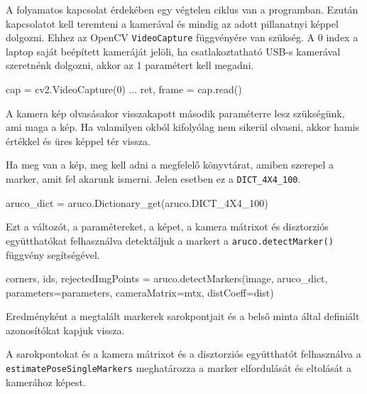 A folyamatos kapcsolat érdekében egy végtelen ciklus van a programban.
Ezután kapcsolatot kell teremteni a kamerával és mindig az adott pillanatnyi képpel dolgozni.
Ehhez az OpenCV \texttt{VideoCapture} függvényére van szükség. A 0 index a laptop saját beépített kameráját jelöli, ha csatlakoztatható USB-s kamerával szeretnénk dolgozni, akkor az 1 paramétert kell megadni.
\begin{python}
cap = cv2.VideoCapture(0)
...
ret, frame = cap.read()
\end{python}
A kamera kép olvasásakor visszakapott második paraméterre lesz szükségünk, ami maga a kép. Ha valamilyen okból kifolyólag nem sikerül olvasni, akkor hamis értékkel és üres képpel tér vissza.

Ha meg van a kép, meg kell adni a megfelelő könyvtárat, amiben szerepel a marker, amit fel akarunk ismerni. Jelen esetben ez a \texttt{DICT\_4X4\_100}.
\begin{python}
aruco_dict = aruco.Dictionary_get(aruco.DICT_4X4_100)
\end{python}
Ezt a változót, a paramétereket, a képet, a kamera mátrixot és disztorziós együtthatókat felhasználva detektáljuk a markert a \texttt{aruco.detectMarker()} függvény segítségével.
\begin{python}
corners, ids, rejectedImgPoints = aruco.detectMarkers(image, aruco_dict,
parameters=parameters,
cameraMatrix=mtx,
distCoeff=dist)
\end{python}
Eredményként a megtalált markerek sarokpontjait és a belső minta által definiált azonosítókat kapjuk vissza.

A sarokpontokat és a kamera mátrixot és a disztorziós együtthatót felhasználva a
\texttt{estimatePoseSingleMarkers} meghatározza a marker elfordulását és eltolását a kamerához képest.

